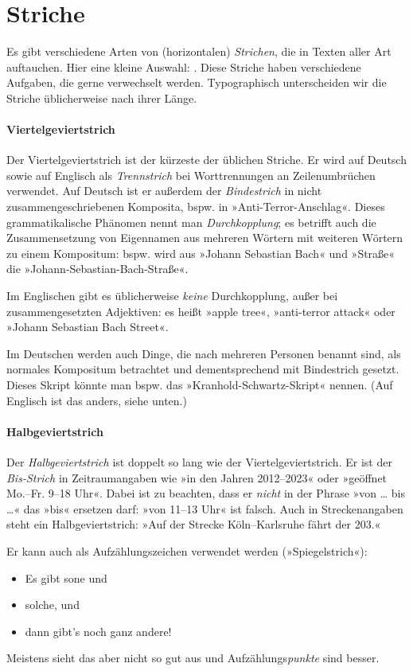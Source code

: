 \section{Striche}

Es gibt verschiedene Arten von (horizontalen) \emph{Strichen}, die in
Texten aller Art auftauchen.  Hier eine kleine Auswahl:
\Char{-\,--\,---\,$-$\,$=$}.  Diese Striche haben verschiedene
Aufgaben, die gerne verwechselt werden.  Typographisch unterscheiden
wir die Striche üblicherweise nach ihrer Länge.

\paragraph{Viertelgeviertstrich}
Der Viertelgeviertstrich \Char{-} ist der kürzeste der üblichen
Striche.  Er wird auf Deutsch sowie auf Englisch als
\emph{Trennstrich} bei Worttrennungen an Zeilenumbrüchen verwendet.
Auf Deutsch ist er außerdem der \emph{Bindestrich} in nicht
zusammengeschriebenen Komposita, bspw. in »Anti-Terror-Anschlag«.
Dieses grammatikalische Phänomen nennt man \emph{Durchkopplung}; es
betrifft auch die Zusammensetzung von Eigennamen aus mehreren Wörtern
mit weiteren Wörtern zu einem Kompositum: bspw. wird aus »Johann
Sebastian Bach« und »Straße« die »Johann-Sebastian-Bach-Straße«.

Im Englischen gibt es üblicherweise \emph{keine} Durchkopplung, außer
bei zusammengesetzten Adjektiven: es heißt »apple tree«, »anti-terror
attack« oder »Johann Sebastian Bach Street«.

Im Deutschen werden auch Dinge, die nach mehreren Personen benannt
sind, als normales Kompositum betrachtet und dementsprechend mit
Bindestrich gesetzt.  Dieses Skript könnte man bspw. das
»Kranhold-Schwartz-Skript« nennen.  (Auf Englisch ist das anders,
siehe unten.)

\paragraph{Halbgeviertstrich}
Der \emph{Halbgeviertstrich} \Char{--} ist doppelt so lang wie der
Viertelgeviertstrich.  Er ist der \emph{Bis-Strich} in Zeitraumangaben
wie »in den Jahren 2012--2023« oder »geöffnet Mo.--Fr. 9--18 Uhr«.
Dabei ist zu beachten, dass er \emph{nicht} in der Phrase »von … bis
…« das »bis« ersetzen darf: »von 11--13 Uhr« ist falsch.  Auch in
Streckenangaben steht ein Halbgeviertstrich: »Auf der Strecke
Köln--Karlsruhe fährt der  203.«

Er kann auch als Aufzählungszeichen verwendet werden
(»Spiegelstrich«):
\begin{itemize}[label=--,nosep]
\item Es gibt sone und
\item solche, und
\item dann gibt's noch ganz andere!
\end{itemize}
Meistens sieht das aber nicht so gut aus und Aufzählungs\emph{punkte}
sind besser.

